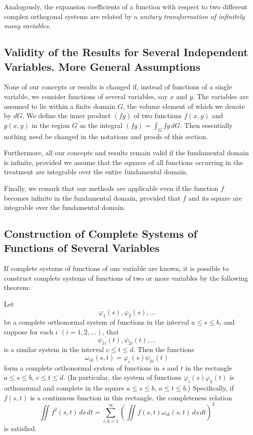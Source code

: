 Analogously, the expansion coefficients of a function with respect to two different complex orthogonal systems are related by a \emph{unitary transformation of infinitely many variables}.

\subsection{Validity of the Results for Several Independent Variables. More General Assumptions}
None of our concepts or results is changed if, instead of functions of a single variable, we consider functions of several variables, say $x$ and $y$. The variables are assumed to lie within a finite domain $G$, the volume element of which we denote by $dG$. We define the inner product $(fg)$ of two functions $f(x,y)$ and $g(x,y)$ in the region $G$ as the integral $(fg)=\int_G fg\,dG$. Then essentially nothing need be changed in the notations and proofs of this section.

Furthermore, all our concepts and results remain valid if the fundamental domain is infinite, provided we assume that the squares of all functions occurring in the treatment are integrable over the entire fundamental domain.

Finally, we remark that our methods are applicable even if the function $f$ becomes infinite in the fundamental domain, provided that $f$ and its square are integrable over the fundamental domain.

\subsection{Construction of Complete Systems of Functions of Several Variables}
If complete systems of functions of one variable are known, it is possible to construct complete systems of functions of two or more variables by the following theorem:

Let
\[
\varphi_1(s),\varphi_2(s),\ldots
\]
be a complete orthonormal system of functions in the interval $a\le s\le b$, and suppose for each $i$ $(i=1,2,\ldots)$, that
\[
\psi_{1i}(t),\psi_{2i}(t),\ldots
\]
is a similar system in the interval $c\le t\le d$. Then the functions
\[
\omega_{ik}(s,t)=\varphi_i(s)\psi_{ki}(t)
\]
form a complete orthonormal system of functions in $s$ and $t$ in the rectangle $a\le s\le b$, $c\le t\le d$. (In particular, the system of functions $\varphi_i(s)\varphi_k(t)$ is orthonormal and complete in the square $a\le s\le b$, $a\le t\le b$.) Specifically, if $f(s,t)$ is a continuous function in this rectangle, the completeness relation
\[
\iint f^2(s,t)\,ds\,dt
=\sum_{i,k=1}^{\infty}\left(\iint f(s,t)\omega_{ik}(s,t)\,ds\,dt\right)^2
\]
is satisfied.

